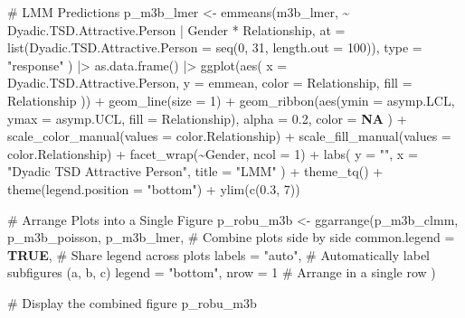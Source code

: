 \documentclass[
  bookmarksnumbered]{article}
\newenvironment{Shaded}{\begin{snugshade}}{\end{snugshade}}
\newcommand{\AttributeTok}[1]{\textcolor[rgb]{0.80,0.80,0.80}{#1}}
\newcommand{\CommentTok}[1]{\textcolor[rgb]{0.50,0.62,0.50}{#1}}
\newcommand{\ConstantTok}[1]{\textcolor[rgb]{0.86,0.64,0.64}{\textbf{#1}}}
\newcommand{\DecValTok}[1]{\textcolor[rgb]{0.86,0.86,0.80}{#1}}
\newcommand{\FloatTok}[1]{\textcolor[rgb]{0.75,0.75,0.82}{#1}}
\newcommand{\FunctionTok}[1]{\textcolor[rgb]{0.94,0.94,0.56}{#1}}
\newcommand{\NormalTok}[1]{\textcolor[rgb]{0.80,0.80,0.80}{#1}}
\newcommand{\OtherTok}[1]{\textcolor[rgb]{0.94,0.94,0.56}{#1}}
\newcommand{\SpecialCharTok}[1]{\textcolor[rgb]{0.86,0.64,0.64}{#1}}
\newcommand{\StringTok}[1]{\textcolor[rgb]{0.80,0.58,0.58}{#1}}
\begin{document}
\begin{Shaded}
\begin{Highlighting}[]
\CommentTok{\# LMM Predictions}
\NormalTok{p\_m3b\_lmer }\OtherTok{\textless{}{-}} \FunctionTok{emmeans}\NormalTok{(m3b\_lmer, }\SpecialCharTok{\textasciitilde{}}\NormalTok{ Dyadic.TSD.Attractive.Person }\SpecialCharTok{|}\NormalTok{ Gender }\SpecialCharTok{*}\NormalTok{ Relationship,}
  \AttributeTok{at =} \FunctionTok{list}\NormalTok{(}\AttributeTok{Dyadic.TSD.Attractive.Person =} \FunctionTok{seq}\NormalTok{(}\DecValTok{0}\NormalTok{, }\DecValTok{31}\NormalTok{, }\AttributeTok{length.out =} \DecValTok{100}\NormalTok{)),}
  \AttributeTok{type =} \StringTok{"response"}
\NormalTok{) }\SpecialCharTok{|\textgreater{}}
  \FunctionTok{as.data.frame}\NormalTok{() }\SpecialCharTok{|\textgreater{}}
  \FunctionTok{ggplot}\NormalTok{(}\FunctionTok{aes}\NormalTok{(}
    \AttributeTok{x =}\NormalTok{ Dyadic.TSD.Attractive.Person, }\AttributeTok{y =}\NormalTok{ emmean,}
    \AttributeTok{color =}\NormalTok{ Relationship, }\AttributeTok{fill =}\NormalTok{ Relationship}
\NormalTok{  )) }\SpecialCharTok{+}
  \FunctionTok{geom\_line}\NormalTok{(}\AttributeTok{size =} \DecValTok{1}\NormalTok{) }\SpecialCharTok{+}
  \FunctionTok{geom\_ribbon}\NormalTok{(}\FunctionTok{aes}\NormalTok{(}\AttributeTok{ymin =}\NormalTok{ asymp.LCL, }\AttributeTok{ymax =}\NormalTok{ asymp.UCL, }\AttributeTok{fill =}\NormalTok{ Relationship),}
    \AttributeTok{alpha =} \FloatTok{0.2}\NormalTok{, }\AttributeTok{color =} \ConstantTok{NA}
\NormalTok{  ) }\SpecialCharTok{+}
  \FunctionTok{scale\_color\_manual}\NormalTok{(}\AttributeTok{values =}\NormalTok{ color.Relationship) }\SpecialCharTok{+}
  \FunctionTok{scale\_fill\_manual}\NormalTok{(}\AttributeTok{values =}\NormalTok{ color.Relationship) }\SpecialCharTok{+}
  \FunctionTok{facet\_wrap}\NormalTok{(}\SpecialCharTok{\textasciitilde{}}\NormalTok{Gender, }\AttributeTok{ncol =} \DecValTok{1}\NormalTok{) }\SpecialCharTok{+}
  \FunctionTok{labs}\NormalTok{(}
    \AttributeTok{y =} \StringTok{""}\NormalTok{, }\AttributeTok{x =} \StringTok{"Dyadic TSD Attractive Person"}\NormalTok{,}
    \AttributeTok{title =} \StringTok{"LMM"}
\NormalTok{  ) }\SpecialCharTok{+}
  \FunctionTok{theme\_tq}\NormalTok{() }\SpecialCharTok{+}
  \FunctionTok{theme}\NormalTok{(}\AttributeTok{legend.position =} \StringTok{"bottom"}\NormalTok{) }\SpecialCharTok{+}
  \FunctionTok{ylim}\NormalTok{(}\FunctionTok{c}\NormalTok{(}\FloatTok{0.3}\NormalTok{, }\DecValTok{7}\NormalTok{))}

\CommentTok{\# Arrange Plots into a Single Figure}
\NormalTok{p\_robu\_m3b }\OtherTok{\textless{}{-}} \FunctionTok{ggarrange}\NormalTok{(p\_m3b\_clmm, p\_m3b\_poisson, p\_m3b\_lmer, }\CommentTok{\# Combine plots side by side}
  \AttributeTok{common.legend =} \ConstantTok{TRUE}\NormalTok{, }\CommentTok{\# Share legend across plots}
  \AttributeTok{labels =} \StringTok{"auto"}\NormalTok{, }\CommentTok{\# Automatically label subfigures (a, b, c)}
  \AttributeTok{legend =} \StringTok{"bottom"}\NormalTok{,}
  \AttributeTok{nrow =} \DecValTok{1} \CommentTok{\# Arrange in a single row}
\NormalTok{)}

\CommentTok{\# Display the combined figure}
\NormalTok{p\_robu\_m3b}
\end{Highlighting}
\end{Shaded}
\end{document}
